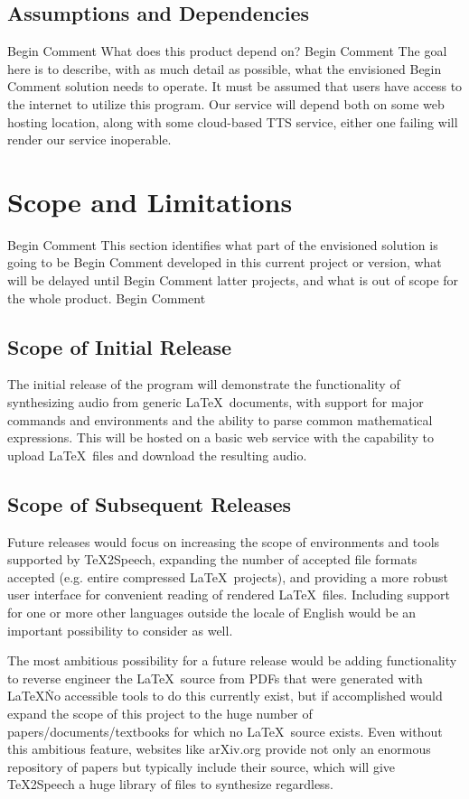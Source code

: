                                                                                                                                                                                                                                                                                                                                                                                                                                                                                                                                                                                                                                                                                                                                                                                                                                                                                                                                                                                                                                                                                                                                                                                                                                                                                                                                                                                                                                                                                                                                                                                                                                                                                                                                                                                                                                                                                                                                                                                                                                                                                                                                                                                                                                                                                                                                                                                                                                                                                                                                                                                                                                                                                                                                                                                                                                                                                                                                                                                                                                                                                                                                                                                                                                                                                                                                                                                                                                                                                                                                                                                                                                                                                                                                                                                                                                                                                                                                                                                                                                                                                                                                                                                                                                                                                                                                                                                                                                                                                                                                                                                                                                                                                                                                                                                                                                                                                                                                                                                                                                                                                                                                                                                                                                                                                                                                                                                                                                                                                                                                                                                                                                                                                                                                                                                                                                                                                                                                                                                                                                                                                                                                                                                                                                                                                                                                                                                                                                                                                                                                                                                                                                                                                                                                                                                                                                                                                                                                                                                                                                                                                                                                                                                                                                                                                                                                                                                                                                                                                                                                                                                                                                                                                                                                                                                                                                                                                                                                                                                                                                                                                                                                                                                                                                                                                                                                                                                                                                                                                                                                                                                                                                                                                                                                                                                                                                                                                                                                                                                                                                                                                                                                                                                                                                                                                                                                                                                                                                                                                                                                                                                                                                                                                                                                                                                                                                                                                                                                                                                                                                                                                                                                                                                                                                                                                                                                                                                                                                                                                                                                                                                                                                                                                                                                                                                                                                                                                                                                                                                                                                                                                                                                                                                                                                                                                                                                                                                                                                                                                                                                                                                                                            \documentclass[letterpaper,12pt]{article}
\begin{document}
\subsection{Assumptions and Dependencies}
Begin Comment  What does this product depend on?  
Begin Comment  The goal here is to describe, with as much detail as possible, what the envisioned
Begin Comment  solution needs to operate.  
It must be assumed that users have access to the internet to utilize this program. Our service will depend both on some web hosting location, along with some cloud-based TTS service, either one failing will render our service inoperable.

\section{Scope and Limitations}
Begin Comment  This section identifies what part of the envisioned solution is going to be
Begin Comment  developed in this current project or version, what will be delayed until
Begin Comment  latter projects, and what is out of scope for the whole product.  
Begin Comment 
\subsection{Scope of Initial Release}
The initial release of the program will demonstrate the functionality of synthesizing audio from generic \LaTeX\ documents, with support for major commands and environments and the ability to parse common mathematical expressions. This will be hosted on a basic web service with the capability to upload \LaTeX\ files and download the resulting audio.

\subsection{Scope of Subsequent Releases}
\par
Future releases would focus on increasing the scope of environments and tools supported by \TeX 2Speech, expanding the number of accepted file formats accepted (e.g. entire compressed \LaTeX\ projects), and providing a more robust user interface for convenient reading of rendered \LaTeX\ files. Including support for one or more other languages outside the locale of English would be an important possibility to consider as well.\\
\par
\noindent The most ambitious possibility for a future release would be adding functionality to reverse engineer the \LaTeX\ source from PDFs that were generated with \LaTeX\. No accessible tools to do this currently exist, but if accomplished would expand the scope of this project to the huge number of papers/documents/textbooks for which no \LaTeX\ source exists. Even without this ambitious feature, websites like arXiv.org provide not only an enormous repository of papers but typically include their source, which will give \TeX 2Speech a huge library of files to synthesize regardless.
\end{document}
